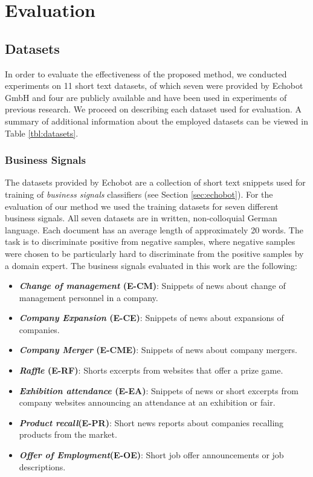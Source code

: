 \chapter{Evaluation}
\label{ch:Evaluation}

\section{Datasets}

In order to evaluate the effectiveness of the proposed method, we conducted experiments
on 11 short text datasets, of which seven were provided by Echobot GmbH and four
are publicly available and have been used in experiments of previous research.
We proceed on describing each dataset used for evaluation. A summary of additional information about
the employed datasets can be viewed in Table \ref{tbl:datasets}. 

\subsection{Business Signals}

The datasets provided by Echobot are a collection of short text snippets used
for training of \emph{business signals} classifiers (see Section
\ref{sec:echobot}).
For the evaluation of our method we used the training datasets for seven different business signals. 
All seven datasets are in written, non-colloquial German language. Each
document has an average length of approximately 20 words. The task is to
discriminate positive from negative samples, where negative samples were chosen
to be particularly hard to discriminate from the positive samples by a domain expert.
The business signals evaluated in this work are the following:

\begin{itemize}
  \setlength\itemsep{0.1em}
  \item \textbf{\textit{Change of management} (E-CM)}: Snippets of news about
  change of management personnel in a company.
  \item \textbf{\textit{Company Expansion} (E-CE)}: Snippets of news about
  expansions of companies.
  \item \textbf{\textit{Company Merger} (E-CME)}: Snippets of news about company
  mergers.
  \item \textbf{\textit{Raffle} (E-RF)}: Shorts excerpts from websites that
  offer a prize game.
  \item \textbf{\textit{Exhibition attendance} (E-EA)}: Snippets of news or
  short excerpts from company websites announcing an attendance at an exhibition or fair.
  \item \textbf{\textit{Product recall}(E-PR)}: Short news reports about
  companies recalling products from the market.
  \item \textbf{\textit{Offer of Employment}(E-OE)}: Short job offer
  announcements or job descriptions.
\end{itemize}

